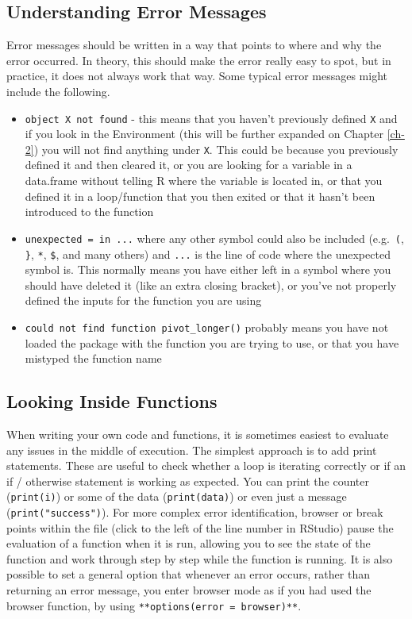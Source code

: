 \documentclass[
]{book}
\providecommand{\tightlist}{%
  \setlength{\itemsep}{0pt}\setlength{\parskip}{0pt}}
\begin{document}
\subsection{Understanding Error Messages}\label{sec:ErrorMessages}

Error messages should be written in a way that points to where and why the error occurred.
In theory, this should make the error really easy to spot, but in practice, it does not always work that way.
Some typical error messages might include the following.

\begin{itemize}
\tightlist
\item
  \texttt{object\ \textquotesingle{}X\textquotesingle{}\ not\ found} - this means that you haven't previously defined \texttt{X} and if you look in the Environment (this will be further expanded on Chapter \ref{ch-2}) you will not find anything under \texttt{X}. This could be because you previously defined it and then cleared it, or you are looking for a variable in a data.frame without telling R where the variable is located in, or that you defined it in a loop/function that you then exited or that it hasn't been introduced to the function
\item
  \texttt{unexpected\ \textquotesingle{}=\textquotesingle{}\ in\ ...} where any other symbol could also be included (e.g.~\texttt{(}, \texttt{\}}, \texttt{*}, \texttt{\$}, and many others) and \texttt{...} is the line of code where the unexpected symbol is. This normally means you have either left in a symbol where you should have deleted it (like an extra closing bracket), or you've not properly defined the inputs for the function you are using
\item
  \texttt{could\ not\ find\ function\ \textquotesingle{}pivot\_longer()\textquotesingle{}} probably means you have not loaded the package with the function you are trying to use, or that you have mistyped the function name
\end{itemize}

\subsection{Looking Inside Functions}\label{looking-inside-functions}

When writing your own code and functions, it is sometimes easiest to evaluate any issues in the middle of execution.
The simplest approach is to add print statements. These are useful to check whether a loop is iterating correctly or if an if / otherwise statement is working as expected.
You can print the counter (\texttt{print(i)}) or some of the data (\texttt{print(data)}) or even just a message (\texttt{print("success")}).
For more complex error identification, browser or break points within the file (click to the left of the line number in RStudio) pause the evaluation of a function when it is run, allowing you to see the state of the function and work through step by step while the function is running.
It is also possible to set a general option that whenever an error occurs, rather than returning an error message, you enter browser mode as if you had used the browser function, by using \texttt{**options(error\ =\ browser)**}.
\end{document}

